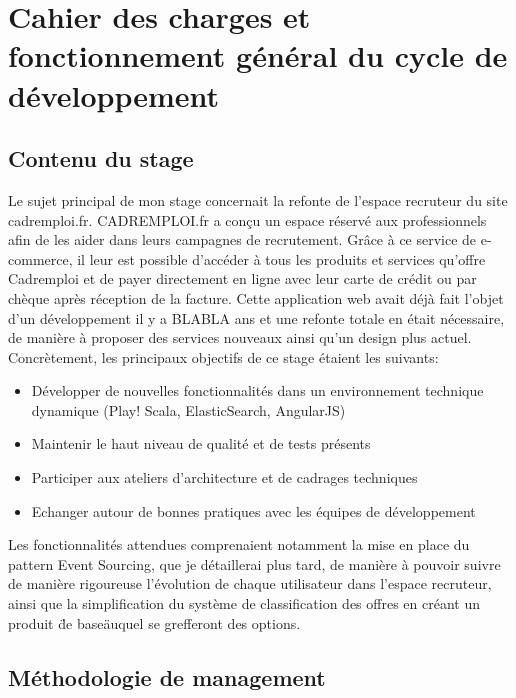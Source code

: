 \section{Cahier des charges et fonctionnement général du cycle de développement}
\subsection{Contenu du stage}
\label{sub:Contenu du stage}

Le sujet principal de mon stage concernait la refonte de l'espace recruteur du site cadremploi.fr.
CADREMPLOI.fr a conçu un espace réservé aux professionnels afin de les aider dans leurs campagnes de recrutement.
Grâce à ce service de e-commerce, il leur est possible d'accéder à tous les produits et services qu'offre Cadremploi et de payer directement en ligne avec leur carte de crédit ou par chèque après réception de la facture.
Cette application web avait déjà fait l'objet d'un développement il y a BLABLA ans et une refonte totale en était nécessaire, de manière à proposer des services nouveaux ainsi qu'un design plus actuel.
Concrètement, les principaux objectifs de ce stage étaient les suivants:
\begin{itemize}
  \item{} Développer de nouvelles fonctionnalités dans un environnement technique dynamique (Play! Scala, ElasticSearch, AngularJS)
  \item{} Maintenir le haut niveau de qualité et de tests présents
  \item{} Participer aux ateliers d'architecture et de cadrages techniques
  \item{} Echanger autour de bonnes pratiques avec les équipes de développement
\end{itemize}
Les fonctionnalités attendues comprenaient notamment la mise en place du pattern Event Sourcing, que je détaillerai plus tard, de manière à pouvoir suivre de manière rigoureuse l'évolution de chaque utilisateur dans l'espace recruteur, ainsi que la simplification du système de classification des offres en créant un produit \"de base\" auquel se grefferont des options.

\subsection{Méthodologie de management}
\label{sub:Méthodologie de management}
